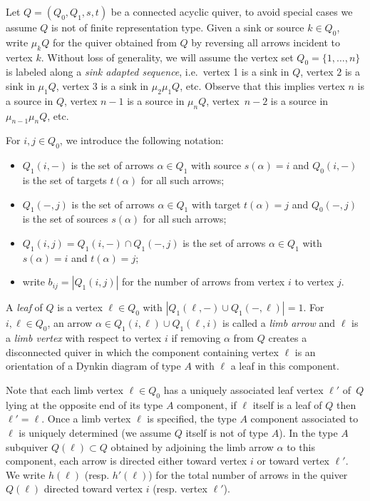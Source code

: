 \documentclass{amsart}
\numberwithin{equation}{section}
\begin{document}
Let $Q=(Q_0,Q_1,s,t)$ be a connected acyclic quiver, to avoid special cases we assume $Q$ is not of finite representation type.
Given a sink or source $k\in Q_0$, write $\mu_k Q$ for the quiver obtained from $Q$ by reversing all arrows incident to vertex $k$.
Without loss of generality, we will assume the vertex set $Q_0=\{1,\ldots,n\}$ is labeled along a \emph{sink adapted sequence}, i.e.~vertex 1 is a sink in $Q$, vertex $2$ is a sink in $\mu_1 Q$, vertex $3$ is a sink in $\mu_2\mu_1 Q$, etc.
Observe that this implies vertex $n$ is a source in $Q$, vertex $n-1$ is a source in $\mu_n Q$, vertex~$n-2$ is a source in $\mu_{n-1}\mu_n Q$, etc.

For $i,j\in Q_0$, we introduce the following notation:
\begin{itemize}
  \item $Q_1(i,-)$ is the set of arrows $\alpha\in Q_1$ with source $s(\alpha)=i$ and $Q_0(i,-)$ is the set of targets $t(\alpha)$ for all such arrows;
  \item $Q_1(-,j)$ is the set of arrows $\alpha\in Q_1$ with target $t(\alpha)=j$ and $Q_0(-,j)$ is the set of sources $s(\alpha)$ for all such arrows;
  \item $Q_1(i,j)=Q_1(i,-)\cap Q_1(-,j)$ is the set of arrows $\alpha\in Q_1$ with $s(\alpha)=i$ and $t(\alpha)=j$;
  \item write $b_{ij}=|Q_1(i,j)|$ for the number of arrows from vertex $i$ to vertex $j$.
\end{itemize}

A \emph{leaf} of $Q$ is a vertex $\ell\in Q_0$ with $|Q_1(\ell,-)\cup Q_1(-,\ell)|=1$.
For $i,\ell\in Q_0$, an arrow $\alpha\in Q_1(i,\ell)\cup Q_1(\ell,i)$ is called a \emph{limb arrow} and $\ell$ is a \emph{limb vertex} with respect to vertex $i$ if removing $\alpha$ from $Q$ creates a disconnected quiver in which the component containing vertex $\ell$ is an orientation of a Dynkin diagram of type $A$ with $\ell$ a leaf in this component.

Note that each limb vertex $\ell\in Q_0$ has a uniquely associated leaf vertex $\ell'$ of~$Q$ lying at the opposite end of its type $A$ component, if $\ell$ itself is a leaf of $Q$ then $\ell'=\ell$.
Once a limb vertex $\ell$ is specified, the type $A$ component associated to $\ell$ is uniquely determined (we assume $Q$ itself is not of type $A$).
In the type $A$ subquiver $Q(\ell)\subset Q$ obtained by adjoining the limb arrow $\alpha$ to this component, each arrow is directed either toward vertex $i$ or toward vertex $\ell'$.
We write $h(\ell)$ (resp. $h'(\ell)$) for the total number of arrows in the quiver $Q(\ell)$ directed toward vertex $i$ (resp. vertex $\ell'$).
\end{document}
